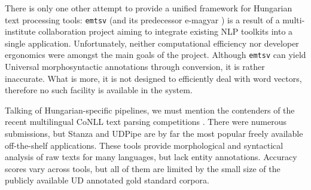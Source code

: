 \documentclass{llncs}
\newcommand{\emtsv}{\texttt{emtsv}}
\newcommand{\udpipe}{UDPipe}
\newcommand{\stanza}{Stanza}
\begin{document}
There is only one other attempt to provide a unified framework for Hungarian text processing tools: \emtsv{} \citep{emtsv1, emtsv2, emtsv3} (and its predecessor e-magyar \citep{emagyar1, emagyar2}) is a result of a multi-institute collaboration project aiming to integrate existing NLP toolkits into a single application. Unfortunately, neither computational efficiency nor developer ergonomics were amongst the main goals of the project. Although \emtsv{} can yield Universal morphosyntactic annotations through conversion, it is rather inaccurate. What is more, it is not designed to efficiently deal with word vectors, therefore no such facility is available in the system.

Talking of Hungarian-specific pipelines, we must mention the contenders of the recent multilingual CoNLL text parsing competitions \citep{conll-2017, conll-2018}. There were numerous  submissions, but \stanza{} \citep{stanza} and \udpipe{} \citep{udpipe} are by far the most popular freely available off-the-shelf applications. These tools provide morphological and syntactical analysis of raw texts for many languages, but lack entity annotations. Accuracy scores vary across tools, but all of them are limited by the small size of the publicly available UD annotated gold standard corpora.
\end{document}
